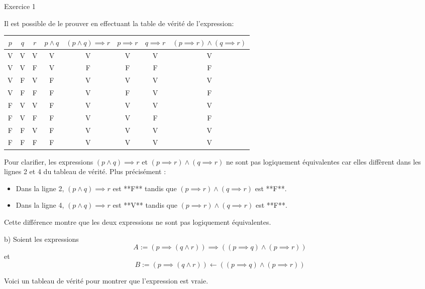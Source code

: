 \documentclass{article}
\begin{document}
Exercice 1

\vspace{0.5cm}
Il est possible de le prouver en effectuant la table de vérité de l'expression:

\begin{center}
\begin{tabular}{| c | c | c | c | c | c | c | c |}
\hline
$p$ & $q$ & $r$ & $p \land q$ & $(p \land q) \implies r$ & $p \implies r$ & $q \implies r$ & $(p \implies r) \land (q \implies r)$ \\
\hline
V & V & V & V & V & V & V & V\\
V & V & F & V & F & F & F & F\\
V & F & V & F & V & V & V & V\\
V & F & F & F & V & F & V & F\\
F & V & V & F & V & V & V & V\\
F & V & F & F & V & V & F & F\\
F & F & V & F & V & V & V & V\\
F & F & F & F & V & V & V & V\\
\hline
\end{tabular}
\end{center}

\vspace{0.5cm}

Pour clarifier, les expressions $(p \land q) \implies r$ et $(p \implies r) \land (q \implies r)$ ne sont pas logiquement équivalentes car elles diffèrent dans les lignes 2 et 4 du tableau de vérité. Plus précisément :

\begin{itemize}
    \item Dans la ligne 2, $(p \land q) \implies r$ est **F** tandis que $(p \implies r) \land (q \implies r)$ est **F**.
    \item Dans la ligne 4, $(p \land q) \implies r$ est **V** tandis que $(p \implies r) \land (q \implies r)$ est **F**.
\end{itemize}

Cette différence montre que les deux expressions ne sont pas logiquement équivalentes.


\vspace{0.5cm}

b) Soient les expressions 
$$A := (p \implies (q \land r)) \implies ((p \implies q) \land (p \implies r))$$ 
et 
$$B := (p \implies (q \land r)) \leftarrow ((p \implies q) \land (p \implies r))$$

Voici un tableau de vérité pour montrer que l'expression est vraie.
\end{document}
